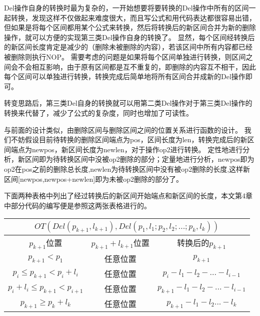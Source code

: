 Del操作自身的转换时最为复杂的，一开始想要将要转换的Del操作中所有的区间一起转换，发现这样不仅做起来难度很大，而且写公式和用代码表达都很容易出错，但如果是将每个区间都用某个公式来转换，然后将转换后的新区间合并为新的删除操作，就可以方便的实现第三类Del操作自身的转换了。
显然，每个区间经转换后的新区间长度肯定是减少的（删除未被删除的内容），若该区间中所有内容都已经被删除则执行NOP。
需要考虑的问题是如果将每个区间单独进行转换，则区间之间会不会相互影响，由于原有区间都是互不重复的，即删除的内容互不相干，因此每个区间可以单独进行转换，转换完成后简单地将所有区间合并成新的Del操作即可。

转变思路后，第三类Del自身的转换就可以用第二类Del操作对于第三类Del操作的转换来代替了，减少了公式的复杂度，同时也增加了可读性。

与前面的设计类似，由删除区间与删除区间之间的位置关系进行函数的设计。
我们不妨假设目前待转换的删除区间端点为pos，区间长度为len，转换完成后的新区间端点为newpos，新区间长度为newlen，对于操作op2进行转换。
定性地进行分析，新区间即为待转换区间中没被op2删除的部分；定量地进行分析，newpos即为op2在pos之前的删除总长度,newlen为待转换区间中没有被op2删除的长度,这样新区间[newpos,newpos+newlen]即为未被op2删除的部分了。

下面两种表格中列出了经过转换后的新区间开始端点和新区间的长度，本文第4章中部分代码的编写便是参照这两张表格进行的。

\begin{table}[H]
\centering
\begin{tabular}{|c|c|c|} 
\hline
\multicolumn{3}{|c|}{$OT(Del(p_{k+1},l_{k+1}),Del(p_1,l_1;p_2,l_2;...;p_k,l_k))$}\\ 
\hline
$p_{k+1}$位置 &$p_{k+1}+l_{k+1}$位置 &转换后的$p_{k+1}$\\
\hline
$p_{k+1} < p_1$  &任意位置  &$p_{k+1}$\\ 
\hline
$p_i \le p_{k+1} < p_i+l_i$ &任意位置  &$p_i-l_1-l_2-...-l_{i-1}$\\ 
\hline
$p_i+l_i \le p_{k+1} < p_{i+1}$  &任意位置  &$p_{k+1}-l_1-l_2-...-l_{i-1}$\\ 
\hline
$p_{k+1} \ge p_k+l_k$  &任意位置  &$p_{k+1}-l_1-l_2...-l_k$\\ 
\hline
\end{tabular}
\end{table}


